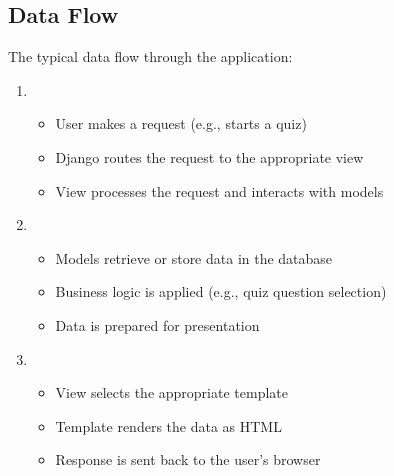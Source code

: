 \documentclass[letterpaper,10pt,english]{sphinxmanual}
\begin{document}
\subsection{Data Flow}
\label{\detokenize{architecture:data-flow}}
\sphinxAtStartPar
The typical data flow through the application:
\begin{enumerate}
%
\item {} 
\sphinxAtStartPar
{}
\begin{itemize}
\item {} 
\sphinxAtStartPar
User makes a request (e.g., starts a quiz)

\item {} 
\sphinxAtStartPar
Django routes the request to the appropriate view

\item {} 
\sphinxAtStartPar
View processes the request and interacts with models

\end{itemize}

\item {} 
\sphinxAtStartPar
{}
\begin{itemize}
\item {} 
\sphinxAtStartPar
Models retrieve or store data in the database

\item {} 
\sphinxAtStartPar
Business logic is applied (e.g., quiz question selection)

\item {} 
\sphinxAtStartPar
Data is prepared for presentation

\end{itemize}

\item {} 
\sphinxAtStartPar
{}
\begin{itemize}
\item {} 
\sphinxAtStartPar
View selects the appropriate template

\item {} 
\sphinxAtStartPar
Template renders the data as HTML

\item {} 
\sphinxAtStartPar
Response is sent back to the user’s browser

\end{itemize}

\end{enumerate}
\end{document}
